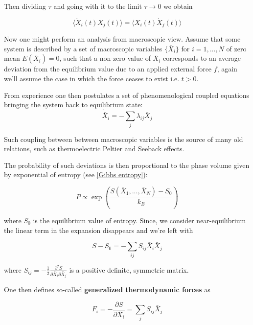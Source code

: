 \documentclass[a4paper,12pt]{article}
\begin{document}
Then dividing $\tau$ and going with it to the limit $\tau \to 0$ we obtain 

\begin{equation}
\label{CorrelationTimeDerivative}
  \langle \dot{X}_i(t) X_j(t) \rangle = \langle X_i(t) \dot{X}_j(t) \rangle
\end{equation}

Now one might perform an analysis from macroscopic view.
Assume that some system is described by a set of macroscopic variables $\{\bar{X}_i\}$ for $i=1,...,N$ of zero mean $E(\bar{X}_i)=0$, such that a non-zero value of $\bar{X}_i$ corresponds to an average deviation from the equilibrium value due to an applied external force $f$, again we'll assume the case in which the force ceases to exist i.e. $t>0$. 

From experience one then postulates a set of phenomenological coupled equations bringing the system back to equilibrium state: 
\begin{equation}
\label{LinearResponseEq}
  \dot{\bar{X}}_i=-\sum_j \lambda_{ij} \bar{X}_j
\end{equation}

Such coupling between between macroscopic variables is the source of many old relations, such as thermoelectric Peltier and Seeback effects.

The probability of such deviations is then proportional to the phase volume given by exponential of entropy (see \ref{Gibbs entropy}):

\begin{equation}
  P \propto \exp(\frac{S(\bar{X}_1,...,\bar{X}_N)-S_0}{k_B})
\end{equation}

where $S_0$ is the equilibrium value of entropy. Since, we consider near-equilibrium the linear term in the expansion disappears and we're left with

\begin{equation}
  S-S_0 = - \sum_{ij} S_{ij}\bar{X}_i \bar{X}_j
\end{equation}

where $S_{ij}= -\frac{1}{2}\frac{\partial^2{S}}{\partial{\bar{X}_i}\partial{\bar{X}_j}}$ is a positive definite, symmetric matrix. %

One then defines so-called \textbf{generalized thermodynamic forces} as

\begin{equation}
  F_i= -\frac{\partial{S}}{\partial{\bar{X}_i}}= \sum_j S_{ij}\bar{X}_j
\end{equation}
\end{document}
